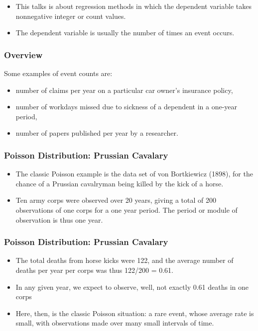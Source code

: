\documentclass[MASTER.tex]{subfiles}
\begin{document}
\begin{frame}
	\Large
\begin{itemize}
\item This talks is about regression methods in which the dependent variable takes
nonnegative integer or count values. \item The dependent variable is usually the number of times an event occurs. 
\end{itemize}
\end{frame}
\begin{frame}
	\frametitle{Overview}
	\Large Some
examples of event counts are:
\begin{itemize}
\item number of claims per year on a particular car owner’s insurance policy,
\item number of workdays missed due to sickness of a dependent in a one-year period,
\item number of papers published per year by a researcher.
\end{itemize}
\end{frame}
\begin{frame}
	\frametitle{Poisson Distribution: Prussian Cavalary}
\Large
\begin{itemize}
\item The classic Poisson example is the data set of von Bortkiewicz (1898), for the chance of a Prussian cavalryman being killed by the kick of a horse. 
\item Ten army corps were observed over 20 years, giving a total of 200 observations of one corps for a one year period. The period or module of observation is thus one year. 


\end{itemize}
\end{frame}
\begin{frame}
	\frametitle{Poisson Distribution: Prussian Cavalary}
	\Large
	\begin{itemize}
\item The total deaths from horse kicks were 122, and the average number of deaths per year per corps was thus 122/200 = 0.61. 
\item In any given year, we expect to observe, well, not exactly 0.61 deaths in one corps 
\item Here, then, is the classic Poisson situation: a rare event, whose average rate is small, with observations made over many small intervals of time.
\end{itemize}
\end{frame}
\end{document}
